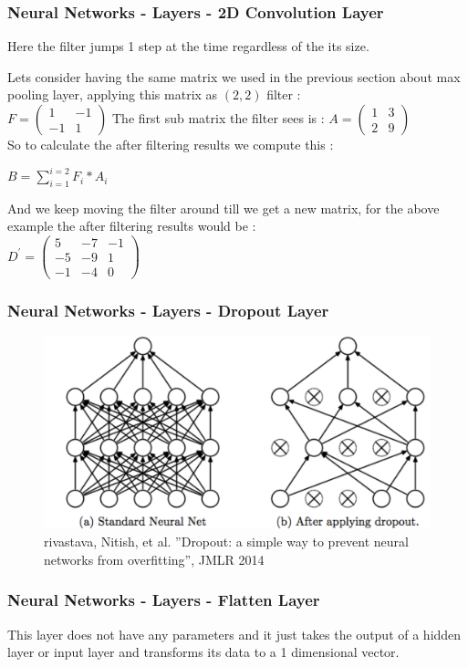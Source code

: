 \documentclass{beamer}
\begin{document}
\begin{frame}
\frametitle{Neural Networks - Layers - 2D Convolution Layer}
Here the filter jumps 1 step at the time regardless of the its size.\\
\begin{example}
Lets consider having the same matrix we used in the previous section about max pooling layer, applying this matrix as $ (2,2) $ filter :\\
$F = 
\begin{pmatrix}
1 & -1\\
-1 & 1
\end{pmatrix}
$
The first sub matrix the filter sees is : 
$A = 
\begin{pmatrix}
1 & 3\\
2 & 9
\end{pmatrix}
$\\
So to calculate the after filtering results we compute this :\\
\begin{center}
$ B = \sum_{i=1}^{i=2}F_i*A_i $
\end{center}
And we keep moving the filter around till we get a new matrix, for the above example the after filtering results would be :\\
$D^{\prime} = 
\begin{pmatrix}
5 & -7 & -1\\
-5 & -9 & 1\\
-1 & -4 & 0
\end{pmatrix}
$
\end{example}
\end{frame}

\begin{frame}
\frametitle{Neural Networks - Layers - Dropout Layer}
\begin{figure}
\centering
\includegraphics[scale=0.3]{dropout.png}
\caption{rivastava, Nitish, et al. ”Dropout: a simple way to prevent neural networks from
overfitting”, JMLR 2014}
\end{figure}
\end{frame}

\begin{frame}
\frametitle{Neural Networks - Layers - Flatten Layer}
\begin{block}{}
This layer does not have any parameters and it just takes the output of a hidden layer or input layer and transforms its data to a 1 dimensional vector.
\end{block}
\end{frame}
\end{document}
